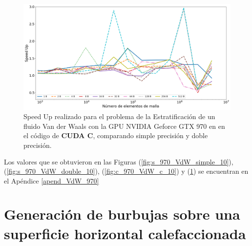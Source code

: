 \begin{figure}[h!]
	\centering
	\includegraphics[width=\textwidth]{figs/cap4/c_970_VdW_cuda_10}
	\caption{Speed Up realizado para el problema de la Estratificación de un fluido Van der Waals con la GPU NVIDIA Geforce GTX 970 en en el código de \textbf{CUDA C}, comparando simple precisión y doble precisión.} 
	\label{fig:c_970_VdW_cuda_10}	
\end{figure}

Los valores que se obtuvieron en las Figuras (\ref{fig:s_970_VdW_simple_10}), (\ref{fig:s_970_VdW_double_10}), (\ref{fig:c_970_VdW_c_10}) y (\ref{fig:c_970_VdW_cuda_10}) se encuentran en el Apéndice \ref{apend_VdW_970}


\newpage


\section{Generación de burbujas sobre una superficie horizontal calefaccionada}
